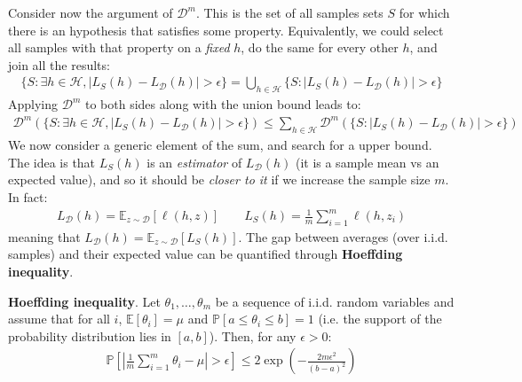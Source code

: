 \documentclass[../template.tex]{subfiles}
\begin{document}
\begin{itemize}
    Consider now the argument of $\mathcal{D}^m$. This is the set of all samples sets $S$ for which there is an hypothesis that satisfies some property. Equivalently, we could select all samples with that property on a \textit{fixed} $h$, do the same for every other $h$, and join all the results: 
    \begin{align*}
        \{S \colon \exists h \in \mathcal{H}, |L_S(h) - L_{\mathcal{D}}(h)| > \epsilon\} = \bigcup_{h \in \mathcal{H}} \{S \colon |L_S(h) - L_{\mathcal{D}}(h)| > \epsilon \}
    \end{align*} 
    Applying $\mathcal{D}^m$ to both sides along with the union bound leads to:
    \begin{align*}
        \mathcal{D}^m(\{S \colon \exists h \in \mathcal{H}, |L_S(h) - L_{\mathcal{D}}(h)| > \epsilon \}) \leq \sum_{h \in \mathcal{H}} \mathcal{D}^m (\{S\colon |L_S(h) - L_{\mathcal{D}}(h)| > \epsilon\})
    \end{align*}
    We now consider a generic element of the sum, and search for a upper bound. The idea is that $L_S(h)$ is an \textit{estimator} of $L_{\mathcal{D}}(h)$ (it is a sample mean vs an expected value), and so it should be \textit{closer to it} if we increase the sample size $m$. In fact:
    \begin{align*}
        L_{\mathcal{D}}(h) = \mathbb{E}_{z \sim \mathcal{D}}[\ell(h, z)] \qquad L_S(h) = \frac{1}{m} \sum_{i=1}^m \ell(h, z_i) 
    \end{align*}   
    meaning that $L_{\mathcal{D}}(h) = \mathbb{E}_{z \sim \mathcal{D}}[L_S(h)]$. The gap between averages (over i.i.d. samples) and their expected value can be quantified through \textbf{Hoeffding inequality}.
    
    \medskip

    \textbf{Hoeffding inequality}. Let $\theta_1, \dots, \theta_m$ be a sequence of i.i.d. random variables and assume that for all $i$, $\mathbb{E}[\theta_i] = \mu$ and $\mathbb{P}[a \leq \theta_i \leq b] =1$ (i.e. the support of the probability distribution lies in $[a,b]$). Then, for any $\epsilon > 0$:
    \begin{align*}
        \mathbb{P} \left[\left| \frac{1}{m} \sum_{i=1}^m \theta_i - \mu  \right | > \epsilon\right] \leq 2 \exp\left(-\frac{2 m \epsilon^2}{(b-a)^2} \right)
    \end{align*}
    
    \medskip


\end{itemize}
\end{document}
